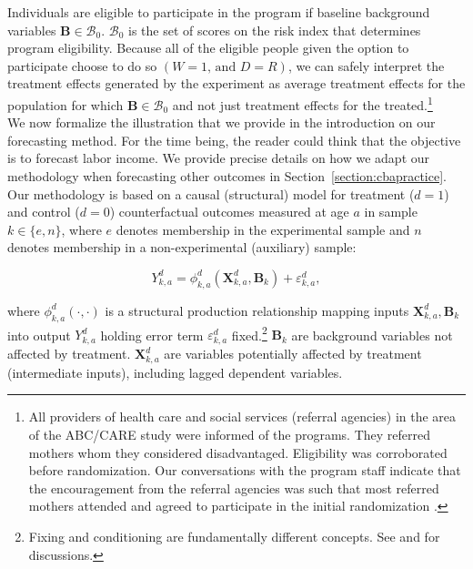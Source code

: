 \noindent Individuals are eligible to participate in the program if baseline background variables $\bm{B}\in\mathcal{B}_0$. $\mathcal{B}_0$ is the set of scores on the risk index that determines program eligibility. Because all of the eligible people given the option to participate choose to do so $(W=1\text{, and } D=R)$, we can safely interpret the treatment effects generated by the experiment as average treatment effects for the population for which $\bm{B}\in\mathcal{B}_0$ and not just treatment effects for the treated.\footnote{All providers of health care and social services (referral agencies) in the area of the ABC/CARE study were informed of the programs. They referred mothers whom they considered disadvantaged. Eligibility was corroborated before randomization. Our conversations with the program staff indicate that the encouragement from the referral agencies was such that most referred mothers attended and agreed to participate in the initial randomization \citep{Ramey-etal_2012-ABC}.}\\

\noindent We now formalize the illustration that we provide in the introduction on our forecasting method. For the time being, the reader could think that the objective is to forecast labor income. We provide precise details on how we adapt our methodology when forecasting other outcomes in Section~\ref{section:cbapractice}.\\

\noindent Our methodology is based on a causal (structural) model for treatment ($d=1$) and control ($d=0$) counterfactual outcomes measured at age $a$ in sample $k \in \{e,n\}$, where $e$ denotes membership in the experimental sample and $n$ denotes membership in a non-experimental (auxiliary) sample:

\begin{equation}
Y^d_{k,a} = \phi^d_{k,a} (\bm{X}^d_{k,a}, \bm{B}_k) + \varepsilon^d_{k,a}, \label{eq:outcome}
\end{equation}

\noindent where $\phi^d_{k,a}\left( \cdot, \cdot \right)$ is a structural production relationship mapping inputs $\bm{X}^d_{k,a}, \bm{B}_k$ into output $Y^d_{k,a}$ holding error term $\varepsilon^d_{k,a}$ fixed.\footnote{Fixing and conditioning are fundamentally different concepts. See \cite{Haavelmo_1943_Econometrica} and \citet{Heckman_Pinto_2015_EconometTheory} for discussions.} $ \bm{B}_k$ are background variables not affected by treatment. $\bm{X}^d_{k,a}$ are variables potentially affected by treatment (intermediate inputs), including lagged dependent variables.\\


